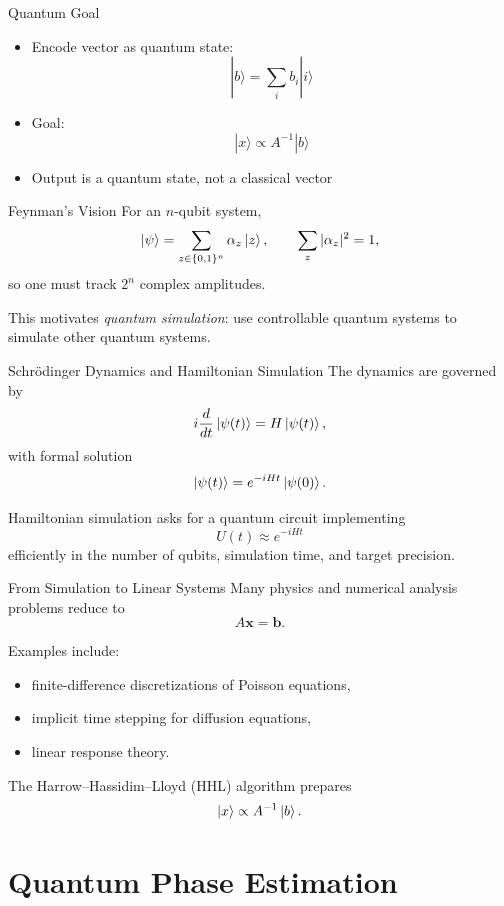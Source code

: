 \documentclass{beamer}
\begin{document}
\begin{frame}{Quantum Goal}
\begin{itemize}
\item Encode vector as quantum state:
\[
|b\rangle = \sum_i b_i |i\rangle
\]
\item Goal:
\[
|x\rangle \propto A^{-1}|b\rangle
\]
\item Output is a quantum state, not a classical vector
\end{itemize}
\end{frame}

\begin{frame}{Feynman's Vision}
For an \(n\)-qubit system,
\[
\ket{\psi}=\sum_{z\in\{0,1\}^n} \alpha_z \ket{z},
\qquad
\sum_z |\alpha_z|^2=1,
\]
so one must track \(2^n\) complex amplitudes.

\medskip

This motivates \emph{quantum simulation}: use controllable quantum systems to simulate other quantum systems.
\end{frame}

\begin{frame}{Schrödinger Dynamics and Hamiltonian Simulation}
The dynamics are governed by
\[
i\frac{d}{dt}\ket{\psi(t)} = H\ket{\psi(t)},
\]
with formal solution
\[
\ket{\psi(t)} = e^{-iHt}\ket{\psi(0)}.
\]

Hamiltonian simulation asks for a quantum circuit implementing
\[
U(t)\approx e^{-iHt}
\]
efficiently in the number of qubits, simulation time, and target precision.
\end{frame}

\begin{frame}{From Simulation to Linear Systems}
Many physics and numerical analysis problems reduce to
\[
A\bm{x}=\bm{b}.
\]

Examples include:
\begin{itemize}
    \item finite-difference discretizations of Poisson equations,
    \item implicit time stepping for diffusion equations,
    \item linear response theory.
\end{itemize}

The Harrow--Hassidim--Lloyd (HHL) algorithm prepares
\[
\ket{x}\propto A^{-1}\ket{b}.
\]
\end{frame}

\section{Quantum Phase Estimation}
\end{document}
